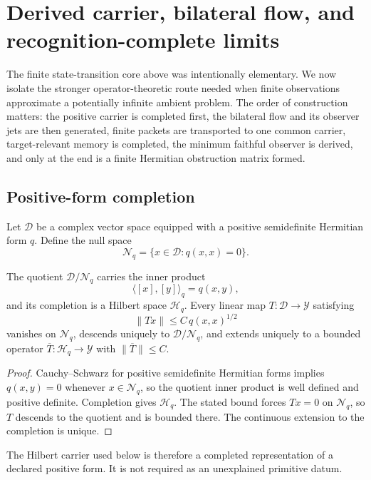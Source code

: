 \section{Derived carrier, bilateral flow, and recognition-complete limits}

The finite state-transition core above was intentionally elementary. We now isolate the stronger operator-theoretic route needed when finite observations approximate a potentially infinite ambient problem. The order of construction matters: the positive carrier is completed first, the bilateral flow and its observer jets are then generated, finite packets are transported to one common carrier, target-relevant memory is completed, the minimum faithful observer is derived, and only at the end is a finite Hermitian obstruction matrix formed.

\subsection{Positive-form completion}

Let $\mathcal D$ be a complex vector space equipped with a positive semidefinite Hermitian form $q$. Define the null space
\[
\mathcal N_q=\{x\in\mathcal D:q(x,x)=0\}.
\]

\begin{theorem}
The quotient $\mathcal D/\mathcal N_q$ carries the inner product
\[
\langle [x],[y]\rangle_q=q(x,y),
\]
and its completion is a Hilbert space $\mathcal H_q$. Every linear map $T:\mathcal D\to\mathcal Y$ satisfying
\[
\|Tx\|\le C\,q(x,x)^{1/2}
\]
vanishes on $\mathcal N_q$, descends uniquely to $\mathcal D/\mathcal N_q$, and extends uniquely to a bounded operator $\overline T:\mathcal H_q\to\mathcal Y$ with $\|\overline T\|\le C$.
\end{theorem}

\begin{proof}
Cauchy--Schwarz for positive semidefinite Hermitian forms implies $q(x,y)=0$ whenever $x\in\mathcal N_q$, so the quotient inner product is well defined and positive definite. Completion gives $\mathcal H_q$. The stated bound forces $Tx=0$ on $\mathcal N_q$, so $T$ descends to the quotient and is bounded there. The continuous extension to the completion is unique.
\end{proof}

\begin{remark}
The Hilbert carrier used below is therefore a completed representation of a declared positive form. It is not required as an unexplained primitive datum.
\end{remark}

